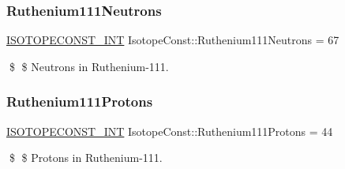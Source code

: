 \subsubsection{\texorpdfstring{Ruthenium111\+Neutrons}{Ruthenium111Neutrons}}
{\footnotesize\ttfamily \mbox{\hyperlink{group___isotope_const-_macros_ga5f18360b3e99483a35c32d789e62621c}{I\+S\+O\+T\+O\+P\+E\+C\+O\+N\+S\+T\+\_\+\+I\+NT}} Isotope\+Const\+::\+Ruthenium111\+Neutrons = 67}

\$ \$ Neutrons in Ruthenium-\/111. \mbox{\label{group___isotope_const-_ruthenium-_ru111_ga33e32808e4d2ce4edb1b507b33f65549}} 
\subsubsection{\texorpdfstring{Ruthenium111\+Protons}{Ruthenium111Protons}}
{\footnotesize\ttfamily \mbox{\hyperlink{group___isotope_const-_macros_ga5f18360b3e99483a35c32d789e62621c}{I\+S\+O\+T\+O\+P\+E\+C\+O\+N\+S\+T\+\_\+\+I\+NT}} Isotope\+Const\+::\+Ruthenium111\+Protons = 44}

\$ \$ Protons in Ruthenium-\/111. 